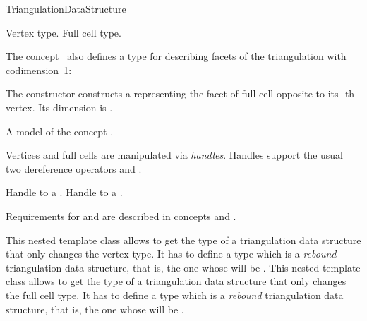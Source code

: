 \begin{ccRefConcept}{TriangulationDataStructure}
\ccHasModels



{
Vertex type.
}
\ccGlue
{}
{
Full cell type.
}

The concept \ccRefName\ also defines a type for describing facets of the
triangulation with codimension~1:


{
The constructor  constructs a  representing the facet of
full cell  opposite to its -th vertex. Its dimension is
.
}
\ccThreeToTwo

{A model of the concept .}

Vertices and full cells are manipulated via \emph{handles}. Handles support the
usual two dereference operators  and .

{
Handle to a .
}
\ccGlue
{}
{
Handle to a .
}


Requirements for  and  are described in concepts
 and
 .

\begin{ccAdvanced}
{This nested template class allows to get the type of a triangulation
data structure that only changes the vertex type.  It has to define a type
 which is a {\it rebound} triangulation data structure, that is, the
one whose  will be .}
\ccGlue
{}
{This nested template class allows to get the type of a triangulation
data structure that only changes the full cell type.  It has to define a type
 which is a {\it rebound} triangulation data structure, that is, the
one whose  will be .}
\end{ccAdvanced}



\end{ccRefConcept}
